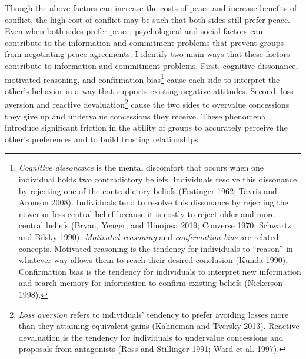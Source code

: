 \documentclass[11pt]{article}
\begin{document}
Though the above factors can increase the costs of peace and increase
benefits of conflict, the high cost of conflict may be such that both
sides still prefer peace. Even when both sides prefer peace,
psychological and social factors can contribute to the information and
commitment problems that prevent groups from negotiating peace
agreements. I identify two main ways that these factors contribute to
information and commitment problems. First, cognitive dissonance,
motivated reasoning, and confirmation bias\footnote{\emph{Cognitive
  dissonance} is the mental discomfort that occurs when one individual
  holds two contradictory beliefs. Individuals resolve this dissonance
  by rejecting one of the contradictory beliefs (Festinger 1962; Tavris
  and Aronson 2008). Individuals tend to resolve this dissonance by
  rejecting the newer or less central belief because it is costly to
  reject older and more central beliefs (Bryan, Yeager, and Hinojosa
  2019; Converse 1970; Schwartz and Bilsky 1990). \emph{Motivated
  reasoning} and \emph{confirmation bias} are related concepts.
  Motivated reasoning is the tendency for individuals to ``reason'' in
  whatever way allows them to reach their desired conclusion (Kunda
  1990). Confirmation bias is the tendency for individuals to interpret
  new information and search memory for information to confirm existing
  beliefs (Nickerson 1998).} cause each side to interpret the other's
behavior in a way that supports existing negative attitudes. Second,
loss aversion and reactive devaluation\footnote{\emph{Loss aversion}
  refers to individuals' tendency to prefer avoiding losses more than
  they attaining equivalent gains (Kahneman and Tversky 2013). Reactive
  devaluation is the tendency for individuals to undervalue concessions
  and proposals from antagonists (Ross and Stillinger 1991; Ward et al.
  1997).} cause the two sides to overvalue concessions they give up and
undervalue concessions they receive. These phenomena introduce
significant friction in the ability of groups to accurately perceive the
other's preferences and to build trusting relationships.
\end{document}

